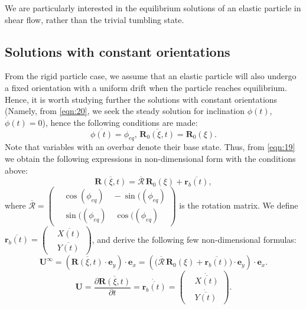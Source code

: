 \documentclass[a4paper,12pt]{report}
\begin{document}
We are particularly interested in the equilibrium solutions of an elastic particle in shear flow, rather than the trivial tumbling state. 

\subsection{Solutions with constant orientations}
From the rigid particle case, we assume that an elastic particle will also undergo a fixed orientation with a uniform drift when the particle reaches equilibrium. Hence, it is worth studying further the solutions with constant orientations (Namely, from \eqref{eqn:20}, we seek the steady solution for inclination $\phi(t)$, $\dot{\phi}(t)=0$), hence the following conditions are made:
\begin{equation}
	\label{eqn:39}
	\overline{\phi(t)}=\phi_{eq},\, \overline{\textbf{R}_0(\xi,t)}=\textbf{R}_0(\xi).
\end{equation}
Note that variables with an overbar denote their base state. Thus, from \eqref{eqn:19} we obtain the following expressions in non-dimensional form with the conditions above:
\begin{equation}
	\label{eqn:40}
	\overline{\textbf{R}(\xi,t)}=\overline{\bm{\mathcal{R}}}\,\textbf{R}_0(\xi)+\overline{\textbf{r}_b(t)},
\end{equation}
where $\overline{\bm{\mathcal{R}}}=\left(\begin{aligned}
	&\cos(\phi_{eq})\quad -\sin((\phi_{eq}) \\
	&\sin((\phi_{eq})\quad \cos((\phi_{eq})
\end{aligned}\right) $ is the rotation matrix. We define $\overline{\textbf{r}_b(t)}=\left(\begin{aligned}
	&\overline{X(t)} \\
	&\overline{Y(t)}
\end{aligned}\right)$, and derive the following few non-dimensional formulas:
\begin{equation}
	\label{eqn:41}
	\textbf{U}^{\infty}=\left(\overline{\textbf{R}(\xi,t)}\cdot\textbf{e}_y\right)\cdot\textbf{e}_x=\left(\Big(\overline{\bm{\mathcal{R}}}\,\textbf{R}_0(\xi)+\overline{\textbf{r}_b(t)}\Big)\cdot\textbf{e}_y\right)\cdot\textbf{e}_x.
\end{equation}
\begin{equation}
	\label{eqn:42}
	\textbf{U}=\frac{\partial\overline{\textbf{R}(\xi,t)}}{\partial t}=\dot{\overline{\textbf{r}_b(t)}}=\left(\begin{aligned}
		&\dot{\overline{X(t)}} \\
		&\dot{\overline{Y(t)}}
	\end{aligned}\right).
\end{equation}
\end{document}
